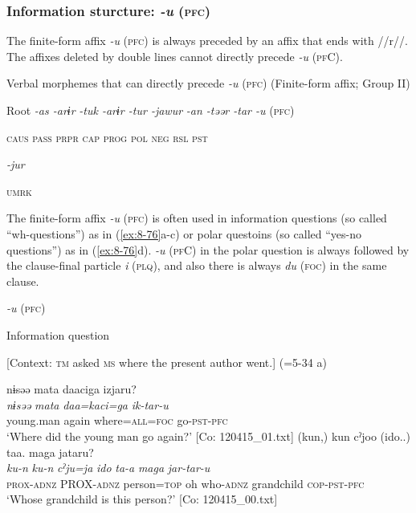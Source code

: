 \subsubsection{Information sturcture: \textit{-u} (\textsc{pfc})}

The finite-form affix \textit{-u} (\textsc{pfc}) is always preceded by an affix that ends with //r//. The affixes deleted by double lines cannot directly precede \textit{-u} (\textsc{pf}C).

\ea\label{ex:8-75}
  Verbal morphemes that can directly precede \textit{-u} (\textsc{pfc}) (Finite-form affix; Group II)

  Root  \textit{-as  -arɨr} %
\textit{-tuk  -arɨr  -tur  -jawur} %
\textit{-an  -təər  -tar  -u} (\textsc{pfc})

    \textsc{caus}  \textsc{pass}  \textsc{prpr}  \textsc{cap}  \textsc{prog}  \textsc{pol}  \textsc{neg}  \textsc{rsl}  \textsc{pst}

          \textit{-jur}

          \textsc{umrk}
\z

The finite-form affix \textit{-u} (\textsc{pfc}) is often used in information questions (so called “wh-questions”) as in (\ref{ex:8-76}a-c) or polar questoins (so called “yes-no questions”) as in (\ref{ex:8-76}d). \textit{-u} (\textsc{pf}C) in the polar question is always followed by the clause-final particle \textit{i} (\textsc{plq}), and also there is always \textit{du} (\textsc{foc}) in the same clause.

\ea\label{ex:8-76}
  \textit{-u} (\textsc{pfc})

  Information question

\ea {}[Context: \textsc{tm} asked \textsc{ms} where the present author went.] (=5-34 a)

{\TM}
\glll  nɨsəə  mata  daaciga  izjaru?\\
\textit{nɨsəə}  \textit{mata}  \textit{daa=kaci=ga}  \textit{ik-tar-u}\\
young.man  again  where=\textsc{all}=\textsc{foc}  go-\textsc{pst}-\textsc{pfc}\\
\glt ‘Where did the young man go again?’ [Co: 120415\_01.txt]
\ex
{\TM}
\glll  (kun,)  kun  cˀjoo  (ido..)  taa.      maga  jataru?      \\
\textit{ku-n}  \textit{ku-n}  \textit{cˀju=ja}  \textit{ido}  \textit{ta-a}      \textit{maga}  \textit{jar-tar-u}      \\
\textsc{prox}-\textsc{adnz}  PROX-\textsc{adnz}  person=\textsc{top}  oh  who-\textsc{adnz}  grandchild  \textsc{cop}-\textsc{pst}-\textsc{pfc}\\
\glt ‘Whose grandchild is this person?’ [Co: 120415\_00.txt]

